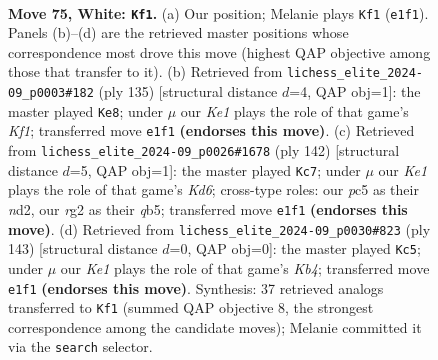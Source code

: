 \documentclass[11pt]{article}
\begin{document}
\clearpage

\begin{figure}[p]\centering
\begin{subfigure}{0.46\textwidth}\centering
\resizebox{\linewidth}{!}{%
\newchessgame
\chessboard[
  setfen={8/4k3/8/2pp4/p7/8/6r1/4K3 w - - 6 75},
  showmover=false,
  pgfstyle=straightmove, color=movearrow, markmove={e1-f1}
]}
\caption{}
\end{subfigure}\hfill
\begin{subfigure}{0.46\textwidth}\centering
\resizebox{\linewidth}{!}{%
\newchessgame
\chessboard[
  setfen={5k2/3R4/5K2/8/4p3/4P2P/8/8 b - - 3 68},
  showmover=false,
  pgfstyle=straightmove, color=movearrow, markmove={f8-e8}
]}
\caption{}
\end{subfigure}
\\[4pt]
\begin{subfigure}{0.46\textwidth}\centering
\resizebox{\linewidth}{!}{%
\newchessgame
\chessboard[
  setfen={8/p7/3K4/1q6/3k3p/8/3n4/8 w - - 4 72},
  showmover=false,
  pgfstyle=straightmove, color=movearrow, markmove={d6-c7}
]}
\caption{}
\end{subfigure}\hfill
\begin{subfigure}{0.46\textwidth}\centering
\resizebox{\linewidth}{!}{%
\newchessgame
\chessboard[
  setfen={8/5P2/8/1k1P2P1/7R/3K4/8/8 b - - 0 72},
  showmover=false,
  pgfstyle=straightmove, color=movearrow, markmove={b5-c5}
]}
\caption{}
\end{subfigure}
\caption{\textbf{Move 75, White: \texttt{Kf1}.} (a) Our position; Melanie plays \texttt{Kf1} (\texttt{e1f1}). Panels (b)--(d) are the retrieved master positions whose correspondence most drove this move (highest QAP objective among those that transfer to it). (b) Retrieved from \texttt{lichess\_elite\_2024-09\_p0003\#182} (ply 135) [structural distance $d$=4, QAP obj=1]: the master played \texttt{Ke8}; under $\mu$ our \emph{Ke1} plays the role of that game's \emph{Kf1}; transferred move \texttt{e1f1} \textbf{(endorses this move)}. (c) Retrieved from \texttt{lichess\_elite\_2024-09\_p0026\#1678} (ply 142) [structural distance $d$=5, QAP obj=1]: the master played \texttt{Kc7}; under $\mu$ our \emph{Ke1} plays the role of that game's \emph{Kd6}; cross-type roles: our \emph{p}c5 as their \emph{n}d2, our \emph{r}g2 as their \emph{q}b5; transferred move \texttt{e1f1} \textbf{(endorses this move)}. (d) Retrieved from \texttt{lichess\_elite\_2024-09\_p0030\#823} (ply 143) [structural distance $d$=0, QAP obj=0]: the master played \texttt{Kc5}; under $\mu$ our \emph{Ke1} plays the role of that game's \emph{Kb4}; transferred move \texttt{e1f1} \textbf{(endorses this move)}. Synthesis: 37 retrieved analogs transferred to \texttt{Kf1} (summed QAP objective 8, the strongest correspondence among the candidate moves); Melanie committed it via the \texttt{search} selector.}
\label{fig:thought-m148}
\end{figure}
\end{document}
